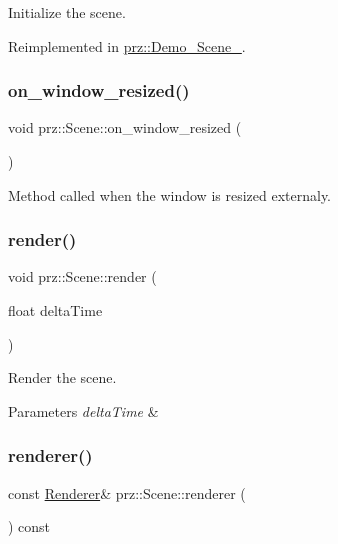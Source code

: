 Initialize the scene. 



Reimplemented in \mbox{\hyperlink{classprz_1_1_demo___scene__01_acaf389e824f310d3f3b06e1c8b510ff2}{prz\+::\+Demo\+\_\+\+Scene\+\_}}.

\mbox{\label{classprz_1_1_scene_a236daf32a516ceb45c5a2ad2fa271b84}} 
\subsubsection{\texorpdfstring{on\_window\_resized()}{on\_window\_resized()}}
{\footnotesize\ttfamily void prz\+::\+Scene\+::on\+\_\+window\+\_\+resized (\begin{DoxyParamCaption}{ }\end{DoxyParamCaption})}



Method called when the window is resized externaly. 

\mbox{\label{classprz_1_1_scene_a1744d861904b1cb0177c913e60911089}} 
\subsubsection{\texorpdfstring{render()}{render()}}
{\footnotesize\ttfamily void prz\+::\+Scene\+::render (\begin{DoxyParamCaption}\item[{float}]{delta\+Time }\end{DoxyParamCaption})}



Render the scene. 


\begin{DoxyParams}{Parameters}
{\em delta\+Time} & \\
\hline
\end{DoxyParams}
\mbox{\label{classprz_1_1_scene_a9b3d951d80efb66226155224fe63956b}} 
\subsubsection{\texorpdfstring{renderer()}{renderer()}}
{\footnotesize\ttfamily const \mbox{\hyperlink{classprz_1_1_renderer}{Renderer}}\& prz\+::\+Scene\+::renderer (\begin{DoxyParamCaption}{ }\end{DoxyParamCaption}) const\hspace{0.3cm}{\ttfamily [inline]}}



